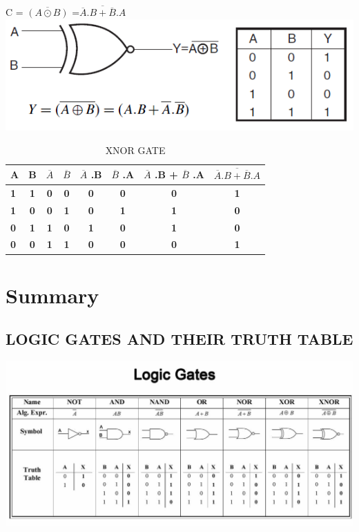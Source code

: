 \documentclass{article}
\begin{document}
C = $\overline{(A \odot B)}$ =$\overline{\overline{A} .B + \overline{B} .A}$
\includegraphics[width=0.7\linewidth]{xnor}
\begin{table}[h!]
	\begin{center}
		\caption{XNOR GATE}
		\begin{tabular}{l|c|c|c|c|c|c|c|}
			\textbf{A} & \textbf{B} & \textbf{$\overline{A}$} & $\overline{B}$ & \textbf{$\overline{A}$ .B} & \textbf{$\overline{B}$ .A} & \textbf{$\overline{A}$ .B + $\overline{B}$ .A} & \textbf{$\overline{\overline{A} .B + \overline{B} .A}$} \\
			\hline
			\textbf{1} & \textbf{1} & \textbf{0} & \textbf{0} & \textbf{0} & \textbf{0} & \textbf{0} & \textbf{1} \\
			\textbf{1} & \textbf{0} & \textbf{0} & \textbf{1} & \textbf{0} & \textbf{1} & \textbf{1} & \textbf{0} \\
			\textbf{0} & \textbf{1} & \textbf{1} & \textbf{0} & \textbf{1} & \textbf{0} & \textbf{1} & \textbf{0} \\
			\textbf{0} & \textbf{0} & \textbf{1} & \textbf{1} & \textbf{0} & \textbf{0} & \textbf{0} & \textbf{1} \\
		\end{tabular}
	\end{center}
\end{table}
\newpage
\section{Summary}
\subsection{LOGIC GATES AND THEIR TRUTH TABLE}
\includegraphics[width=0.8\linewidth]{truth table}
\end{document}
